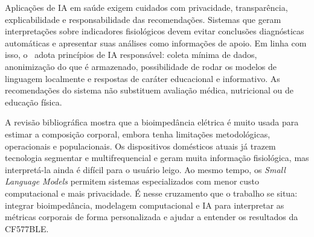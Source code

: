 Aplicações de IA em saúde exigem cuidados com privacidade, transparência, explicabilidade
e responsabilidade das recomendações. Sistemas que geram interpretações sobre indicadores
fisiológicos devem evitar conclusões diagnósticas automáticas e apresentar suas análises
como informações de apoio. Em linha com isso, o \sintonia\ adota princípios de IA
responsável: coleta mínima de dados, anonimização do que é armazenado, possibilidade de
rodar os modelos de linguagem localmente e respostas de caráter educacional e informativo.
As recomendações do sistema não substituem avaliação médica, nutricional ou de educação
física.

A revisão bibliográfica mostra que a bioimpedância elétrica é muito usada para estimar a composição
corporal, embora tenha limitações metodológicas, operacionais e populacionais. Os
dispositivos domésticos atuais já trazem tecnologia segmentar e multifrequencial e geram
muita informação fisiológica, mas interpretá-la ainda é difícil para o usuário leigo. Ao
mesmo tempo, os \emph{Small Language Models} permitem sistemas especializados com menor
custo computacional e mais privacidade. É nesse cruzamento que o trabalho se situa:
integrar bioimpedância, modelagem computacional e IA para interpretar as métricas
corporais de forma personalizada e ajudar a entender os resultados da CF577BLE.
                                                                                                                                                                                                                                                                                  